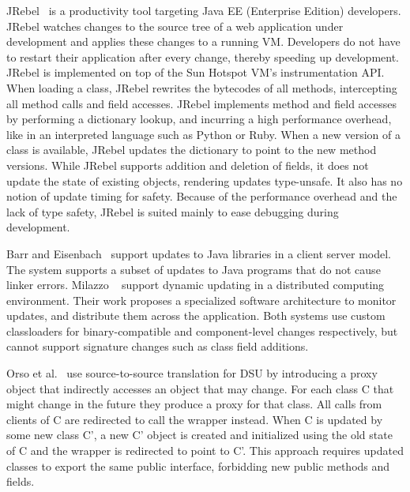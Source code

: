 JRebel~\cite{javarebel} is a productivity tool targeting Java EE
(Enterprise Edition) developers. JRebel watches changes to the source tree
of a web application under development and applies these changes to a
running VM. Developers do not have to restart their application after every
change, thereby speeding up development. JRebel is implemented on top of
the Sun Hotspot VM's instrumentation API. When loading a class, JRebel
rewrites the bytecodes of all methods, intercepting all method calls and
field accesses. JRebel implements method and field accesses by performing a
dictionary lookup, and incurring a high performance overhead, like in an
interpreted language such as Python or Ruby.  When a new version of a class
is available, JRebel updates the dictionary to point to the new method
versions. While JRebel supports addition and deletion of fields, it does
not update the state of existing objects, rendering updates type-unsafe. It
also has no notion of update timing for safety. Because of the performance
overhead and the lack of type safety, JRebel is suited mainly to ease
debugging during development.

Barr and Eisenbach~\cite{BarrE03} support updates to Java libraries in a
client server model. The system supports a subset of updates to Java
programs that do not cause linker errors.  Milazzo
\EA~\cite{Milazzo05updates} support dynamic updating in a distributed
computing environment. Their work proposes a specialized software
architecture to monitor updates, and distribute them across the
application.  Both systems use custom classloaders for binary-compatible
and component-level changes respectively, but cannot support signature
changes such as class field additions.



Orso et al.~\cite{orso:java} use source-to-source translation for DSU by
introducing a proxy object that indirectly accesses an object that may
change. For each class C that might change in the future they produce a
proxy for that class.  All calls from clients of C are redirected to call
the wrapper instead.  When C is updated by some new class C', a new C'
object is created and initialized using the old state of C and the wrapper
is redirected to point to C'. This approach requires updated classes to
export the same public interface, forbidding new public methods and fields.

